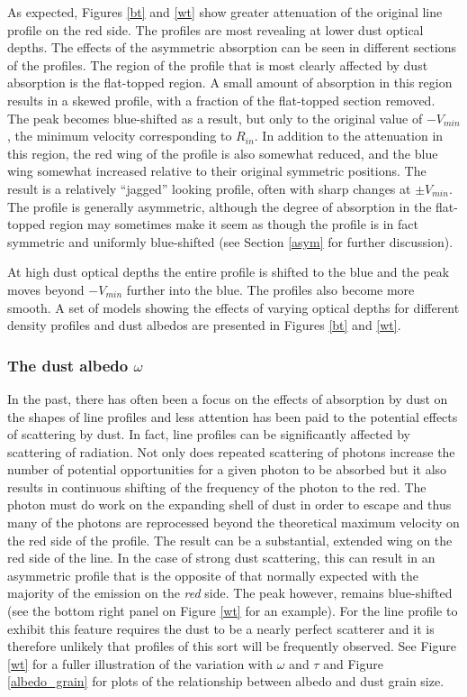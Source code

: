 \documentclass[useAMS,usenatbib,usegraphicx]{mnras}
\begin{document}
As expected, Figures \ref{bt} and \ref{wt} show greater attenuation of the original line profile on 
the red side.  The profiles are most revealing at lower 
dust optical depths.  The effects of the asymmetric absorption can be seen in 
different sections of the profiles.  The region of the profile that is 
most clearly affected by dust absorption is the flat-topped region.  A 
small amount of absorption in this region results in a skewed profile, 
with a fraction of the flat-topped section removed.  The peak becomes 
blue-shifted as a result, but only to the original value of $-V_{min}$, the minimum 
velocity corresponding to $R_{in}$. In addition to the attenuation in this region, 
the red wing of the profile is also somewhat reduced, and the blue wing 
somewhat increased relative to their original symmetric positions.  The 
result is a relatively ``jagged'' looking profile, often with sharp changes 
at $\pm V_{min}$.  The profile is generally asymmetric, although the 
degree of absorption in the flat-topped region may sometimes make it seem 
as though the profile is in fact symmetric and uniformly blue-shifted (see 
Section \ref{asym} for further discussion).

At high dust optical depths the entire profile is shifted to the blue and the 
peak moves beyond $-V_{min}$ further into the blue.  The 
profiles also become more smooth.  A set of models showing 
the effects of varying optical depths for different density profiles and 
dust albedos are presented in Figures \ref{bt} and \ref{wt}.



\subsubsection{The dust albedo $\omega$}
\label{omega}

In the past, there has often been a focus on the effects of absorption by dust 
on the shapes of line profiles and less attention has been paid to the 
potential effects of scattering by dust.  In fact, line profiles 
can be significantly affected by scattering of radiation.  Not only does 
repeated scattering of photons increase the number of potential 
opportunities for a given photon to be absorbed but it also results in 
continuous shifting of the frequency of the photon to the red.  The photon 
must do work on the expanding shell of dust in order to escape and thus 
many of the photons are reprocessed beyond the theoretical maximum 
velocity on the red side of the profile.  The result can be a substantial, 
extended wing on the red side of the line.  In the case of strong 
dust scattering, this can result in an asymmetric profile that is the opposite 
of that normally expected with the majority of the emission on the 
\textit{red} side.  The peak however, remains blue-shifted (see the bottom right panel on Figure \ref{wt} for an example).  
For the line profile to exhibit this feature requires the dust to be a 
nearly perfect scatterer and it is therefore unlikely that profiles of this sort will be
frequently observed.  See Figure \ref{wt} for a fuller illustration of the variation
with $\omega$ and $\tau$ and Figure \ref{albedo_grain} for plots of the relationship between albedo and dust grain size.
\end{document}
